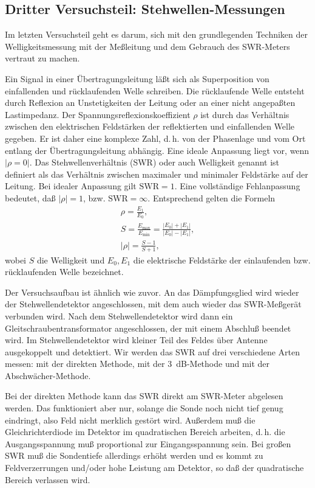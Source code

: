 \subsection{%
  Dritter Versuchsteil: Stehwellen-Messungen}

Im letzten Versuchsteil geht es darum, sich mit den grundlegenden
Techniken der Welligkeitsmessung mit der Meßleitung und dem Gebrauch des
SWR-Meters vertraut zu machen.

Ein Signal in einer Übertragungsleitung läßt sich als Superposition von
einfallenden und rücklaufenden Welle schreiben.  Die rücklaufende Welle
entsteht durch Reflexion an Unstetigkeiten der Leitung oder an einer
nicht angepaßten Lastimpedanz. Der Spannungsreflexionskoeffizient $\rho$
ist durch das Verhältnis zwischen den elektrischen Feldstärken der
reflektierten und einfallenden Welle gegeben. Er ist daher eine komplexe
Zahl, d.\,h. von der Phasenlage und vom Ort entlang der
Übertragungsleitung abhängig.  Eine ideale Anpassung liegt vor, wenn
$|\rho = 0|$.  Das Stehwellenverhältnis (SWR) oder auch Welligkeit
genannt ist definiert als das Verhältnis zwischen maximaler und
minimaler Feldstärke auf der Leitung.  Bei idealer Anpassung gilt
$\text{SWR} = 1$.  Eine vollständige Fehlanpassung bedeutet, daß $|\rho|
= 1$, bzw. $\text{SWR} = \infty$.  Entsprechend gelten die Formeln
%
\begin{gather}
  \rho = \frac{E_1}{E_0},\\
  S = \frac{E_\text{max}}{E_\text{min}} = \frac{|E_0| + |E_1|}{|E_0| -
    |E_1|},\\
  |\rho| = \frac{S-1}{S+1},
\end{gather}
%
wobei $S$ die Welligkeit und $E_0,E_1$ die elektrische Feldstärke der
einlaufenden bzw. rücklaufenden Welle bezeichnet.

Der Versuchsaufbau ist ähnlich wie zuvor.  An das Dämpfungsglied wird
wieder der Stehwellendetektor angeschlossen, mit dem auch wieder das
SWR-Meßgerät verbunden wird.  Nach dem Stehwellendetektor wird dann ein
Gleitschraubentransformator angeschlossen, der mit einem Abschluß
beendet wird. Im Stehwellendetektor wird kleiner Teil des Feldes über
Antenne ausgekoppelt und detektiert.  Wir werden das SWR auf drei
verschiedene Arten messen: mit der direkten Methode, mit der
\SI{3}{dB}-Methode und mit der Abschwächer-Methode.

Bei der direkten Methode kann das SWR direkt am SWR-Meter abgelesen
werden. Das funktioniert aber nur, solange die Sonde noch nicht tief
genug eindringt, also Feld nicht merklich gestört wird.  Außerdem muß
die Gleichrichterdiode im Detektor im quadratischen Bereich arbeiten,
d.\,h. die Ausgangsspannung muß proportional zur Eingangsspannung
sein. Bei großen SWR muß die Sondentiefe allerdings erhöht werden und es
kommt zu Feldverzerrungen und/oder hohe Leistung am Detektor, so daß der
quadratische Bereich verlassen wird.

